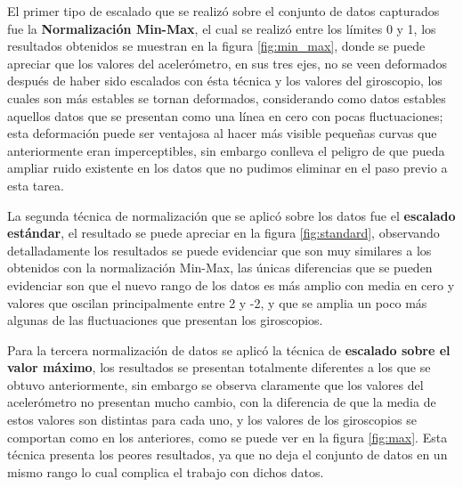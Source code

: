 \vspace{5mm} %

El primer tipo de escalado que se realiz\'{o} sobre el conjunto de datos capturados fue la \textbf{Normalizaci\'{o}n Min-Max}, el cual se realiz\'{o} entre los l\'{i}mites 0 y 1, los resultados obtenidos se muestran en la figura \ref{fig:min_max}, donde se puede apreciar que los valores del aceler\'{o}metro, en sus tres ejes, no se veen deformados despu\'{e}s de haber sido escalados con \'{e}sta t\'{e}cnica y los valores del giroscopio, los cuales son m\'{a}s estables se tornan deformados, considerando como datos estables aquellos datos que se presentan como una l\'{i}nea en cero con pocas fluctuaciones; esta deformaci\'{o}n puede ser ventajosa al hacer m\'{a}s visible peque\~{n}as curvas que anteriormente eran imperceptibles, sin embargo conlleva el peligro de que pueda ampliar ruido existente en los datos que no pudimos eliminar en el paso previo a esta tarea.


\vspace{5mm} %

La segunda t\'{e}cnica de normalizaci\'{o}n que se aplic\'{o} sobre los datos fue el \textbf{escalado est\'{a}ndar}, el resultado se puede apreciar en la figura \ref{fig:standard}, observando detalladamente los resultados se puede evidenciar que son muy similares a los obtenidos con la normalizaci\'{o}n Min-Max, las \'{u}nicas diferencias que se pueden evidenciar son que el nuevo rango de los datos es m\'{a}s amplio con media en cero y valores que oscilan principalmente entre 2 y -2,  y que se amplia un poco m\'{a}s algunas de las fluctuaciones que presentan los giroscopios.

\vspace{5mm} %

Para la tercera normalizaci\'{o}n de datos se aplic\'{o} la t\'{e}cnica de \textbf{escalado sobre el valor m\'{a}ximo}, los resultados se presentan totalmente diferentes a los que se obtuvo anteriormente, sin embargo se observa claramente que los valores del aceler\'{o}metro no presentan mucho cambio, con la diferencia de que la media de estos valores son distintas para cada uno, y los valores de los giroscopios se comportan como en los anteriores, como se puede ver en la figura \ref{fig:max}. Esta t\'{e}cnica presenta los peores resultados, ya que no deja el conjunto de datos en un mismo rango lo cual complica el trabajo con dichos datos.

\vspace{5mm} %

